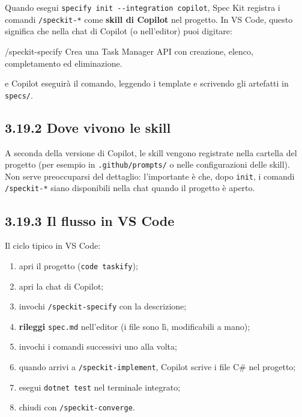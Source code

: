 \documentclass[
  italian,
  10pt,
]{book}
\newenvironment{Shaded}{\begin{snugshade}}{\end{snugshade}}
\newcommand{\NormalTok}[1]{#1}
\providecommand{\tightlist}{%
  \setlength{\itemsep}{0pt}\setlength{\parskip}{0pt}}
\begin{document}
Quando esegui \texttt{specify\ init\ -\/-integration\ copilot}, Spec Kit
registra i comandi \texttt{/speckit-*} come \textbf{skill di Copilot}
nel progetto. In VS Code, questo significa che nella chat di Copilot (o
nell'editor) puoi digitare:

\begin{Shaded}
\begin{Highlighting}[]
\NormalTok{/speckit{-}specify Crea una Task Manager API con creazione, elenco, completamento ed eliminazione.}
\end{Highlighting}
\end{Shaded}

e Copilot eseguirà il comando, leggendo i template e scrivendo gli
artefatti in \texttt{specs/}.

\subsection{3.19.2 Dove vivono le skill}\label{dove-vivono-le-skill}

A seconda della versione di Copilot, le skill vengono registrate nella
cartella del progetto (per esempio in \texttt{.github/prompts/} o nelle
configurazioni delle skill). Non serve preoccuparsi del dettaglio:
l'importante è che, dopo \texttt{init}, i comandi \texttt{/speckit-*}
siano disponibili nella chat quando il progetto è aperto.

\subsection{3.19.3 Il flusso in VS Code}\label{il-flusso-in-vs-code}

Il ciclo tipico in VS Code:

\begin{enumerate}
\def\labelenumi{\arabic{enumi}.}
\tightlist
\item
  apri il progetto (\texttt{code\ taskify});
\item
  apri la chat di Copilot;
\item
  invochi \texttt{/speckit-specify} con la descrizione;
\item
  \textbf{rileggi} \texttt{spec.md} nell'editor (i file sono lì,
  modificabili a mano);
\item
  invochi i comandi successivi uno alla volta;
\item
  quando arrivi a \texttt{/speckit-implement}, Copilot scrive i file C\#
  nel progetto;
\item
  esegui \texttt{dotnet\ test} nel terminale integrato;
\item
  chiudi con \texttt{/speckit-converge}.
\end{enumerate}
\end{document}
